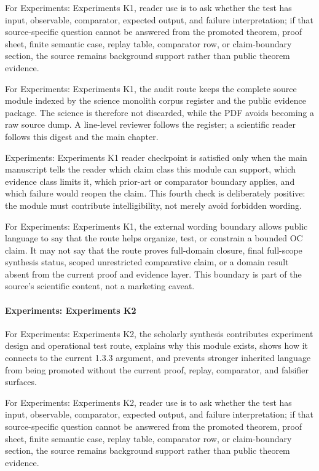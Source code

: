 For Experiments: Experiments K1, reader use is to ask whether the test has input, observable, comparator, expected output, and failure interpretation; if that source-specific question cannot be answered from the promoted theorem, proof sheet, finite semantic case, replay table, comparator row, or claim-boundary section, the source remains background support rather than public theorem evidence.


For Experiments: Experiments K1, the audit route keeps the complete source module indexed by the science monolith corpus register and the public evidence package. The science is therefore not discarded, while the PDF avoids becoming a raw source dump. A line-level reviewer follows the register; a scientific reader follows this digest and the main chapter.


Experiments: Experiments K1 reader checkpoint is satisfied only when the main manuscript tells the reader which claim class this module can support, which evidence class limits it, which prior-art or comparator boundary applies, and which failure would reopen the claim. This fourth check is deliberately positive: the module must contribute intelligibility, not merely avoid forbidden wording.


For Experiments: Experiments K1, the external wording boundary allows public language to say that the route helps organize, test, or constrain a bounded OC claim. It may not say that the route proves full-domain closure, final full-scope synthesis status, scoped unrestricted comparative claim, or a domain result absent from the current proof and evidence layer. This boundary is part of the source's scientific content, not a marketing caveat.


\paragraph{Experiments: Experiments K2}

For Experiments: Experiments K2, the scholarly synthesis contributes experiment design and operational test route, explains why this module exists, shows how it connects to the current 1.3.3 argument, and prevents stronger inherited language from being promoted without the current proof, replay, comparator, and falsifier surfaces.


For Experiments: Experiments K2, reader use is to ask whether the test has input, observable, comparator, expected output, and failure interpretation; if that source-specific question cannot be answered from the promoted theorem, proof sheet, finite semantic case, replay table, comparator row, or claim-boundary section, the source remains background support rather than public theorem evidence.


